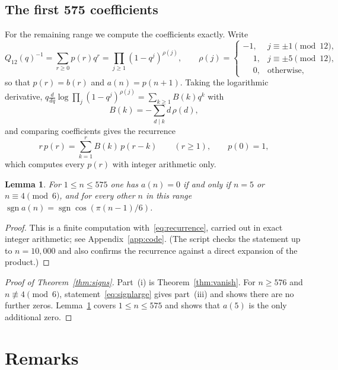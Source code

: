 \documentclass[11pt]{amsart}
\numberwithin{equation}{section}
\newtheorem{lemma}[theorem]{Lemma}
\theoremstyle{definition}
\theoremstyle{remark}
\newcommand{\sgn}{\operatorname{sgn}}
\begin{document}
\subsection{The first 575 coefficients}
For the remaining range we compute the coefficients exactly. Write
\begin{equation}\label{eq:P}
Q_{12}(q)^{-1}=\sum_{r\ge0}p(r)q^r=\prod_{j\ge1}(1-q^j)^{\rho(j)},\qquad
\rho(j)=\begin{cases}-1,& j\equiv\pm1\pmod{12},\\ \phantom{-}1,& j\equiv\pm5\pmod{12},\\ \phantom{-}0,&\text{otherwise},\end{cases}
\end{equation}
so that $p(r)=b(r)$ and $a(n)=p(n+1)$. Taking the logarithmic derivative, $q\frac{d}{dq}\log\prod_j(1-q^j)^{\rho(j)}=\sum_{k\ge1}B(k)q^k$ with
\[
B(k)=-\sum_{d\mid k}d\,\rho(d),
\]
and comparing coefficients gives the recurrence
\begin{equation}\label{eq:recurrence}
r\,p(r)=\sum_{k=1}^rB(k)\,p(r-k)\qquad(r\ge1),\qquad p(0)=1,
\end{equation}
which computes every $p(r)$ with integer arithmetic only.

\begin{lemma}\label{lem:finite}
For $1\le n\le575$ one has $a(n)=0$ if and only if $n=5$ or $n\equiv4\pmod6$, and for every other $n$ in this range $\sgn a(n)=\sgn\cos(\pi(n-1)/6)$.
\end{lemma}

\begin{proof}
This is a finite computation with~\eqref{eq:recurrence}, carried out in exact integer arithmetic; see Appendix~\ref{app:code}. (The script checks the statement up to $n=10{,}000$ and also confirms the recurrence against a direct expansion of the product.)
\end{proof}

\begin{proof}[Proof of Theorem~\ref{thm:signs}]
Part~(i) is Theorem~\ref{thm:vanish}. For $n\ge576$ and $n\not\equiv4\pmod6$, statement~\eqref{eq:signlarge} gives part~(iii) and shows there are no further zeros. Lemma~\ref{lem:finite} covers $1\le n\le575$ and shows that $a(5)$ is the only additional zero.
\end{proof}

\section{Remarks}\label{sec:remarks}
\end{document}
